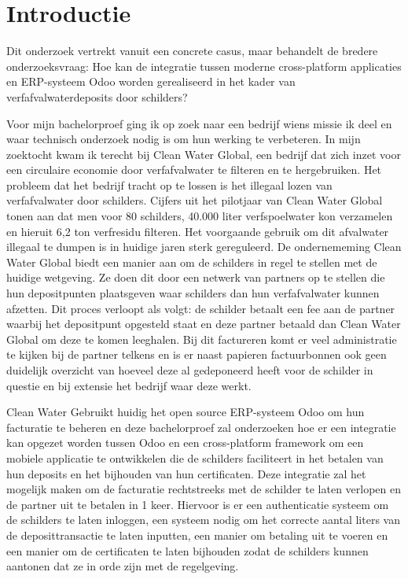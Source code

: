 \section{Introductie}%
\label{sec:introductie}

Dit onderzoek vertrekt vanuit een concrete casus, 
maar behandelt de bredere onderzoeksvraag: 
Hoe kan de integratie tussen moderne cross-platform applicaties en ERP-systeem Odoo worden gerealiseerd in het kader van verfafvalwaterdeposits door schilders?

\bigskip
Voor mijn bachelorproef ging ik op zoek naar een bedrijf wiens missie ik deel 
en waar technisch onderzoek nodig is om hun werking te verbeteren.
In mijn zoektocht kwam ik terecht bij Clean Water Global, 
een bedrijf dat zich inzet voor een circulaire economie door verfafvalwater te filteren en te hergebruiken.
Het probleem dat het bedrijf tracht op te lossen is het illegaal lozen van verfafvalwater door schilders.
Cijfers uit het pilotjaar van Clean Water Global tonen aan dat men voor 80 schilders, 40.000 liter verfspoelwater kon verzamelen en hieruit 6,2 ton verfresidu filteren.
Het voorgaande gebruik om dit afvalwater illegaal te dumpen is in huidige jaren sterk gereguleerd. 
De ondernememing Clean Water Global biedt een manier aan om de schilders in regel te stellen met de huidige wetgeving.
Ze doen dit door een netwerk van partners op te stellen die hun depositpunten plaatsgeven waar schilders dan hun verfafvalwater kunnen afzetten.
Dit proces verloopt als volgt: de schilder betaalt een fee aan de partner waarbij het depositpunt opgesteld staat en deze partner betaald dan Clean Water Global om deze te komen leeghalen.
Bij dit factureren komt er veel administratie te kijken bij de partner telkens en 
is er naast papieren factuurbonnen ook geen duidelijk overzicht van hoeveel deze al gedeponeerd heeft 
voor de schilder in questie en bij extensie het bedrijf waar deze werkt.

\bigskip

Clean Water Gebruikt huidig het open source ERP-systeem Odoo om hun facturatie te beheren en deze bachelorproef zal onderzoeken hoe er een integratie kan opgezet worden 
tussen Odoo en een cross-platform framework om een mobiele applicatie te ontwikkelen die de schilders faciliteert in het betalen van hun deposits en het bijhouden van hun certificaten.
Deze integratie zal het mogelijk maken om de facturatie rechtstreeks met de schilder te laten verlopen en de partner uit te betalen in 1 keer.
Hiervoor is er een authenticatie systeem om de schilders te laten inloggen, een systeem nodig om het correcte aantal liters van de deposittransactie te laten inputten, 
een manier om betaling uit te voeren en een manier om de certificaten te laten bijhouden zodat de schilders kunnen aantonen dat ze in orde zijn met de regelgeving.

